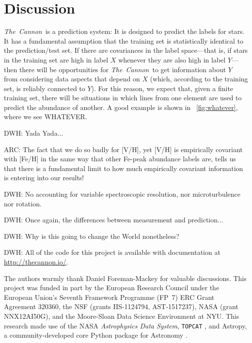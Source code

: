 \documentclass[12pt,preprint]{aastex}
\newcommand{\project}[1]{\textsl{#1}}
\newcommand{\TheCannon}{\project{The~Cannon}}
\newcommand{\acronym}[1]{{\small{#1}}}
\begin{document}
\section{Discussion}
\label{sec:discussion}




\TheCannon\ is a prediction system: It is designed to predict the labels for 
stars.  It has a fundamental assumption that the training set is statistically
identical to the prediction/test set.  If there are covariances in the label 
space---that is, if stars in the training set are high in label $X$ whenever
they are also high in label $Y$---then there will be opportunities for 
\TheCannon\ to get information about $Y$ from considering data aspects that 
depend on $X$ (which, according to the training set, is reliably connected to 
$Y$).  For this reason, we expect that, given a finite training set, there will
be situations in which lines from one element are used to predict the abundance
of another.  A good example is shown in \figurename~\ref{fig:whatever}, where we
see WHATEVER.

DWH: Yada Yada...


ARC: The fact that we do so badly for [V/H], yet [V/H] is empirically covariant with [Fe/H] in the same way that other Fe-peak abundance labels are, tells us that there is a fundamental limit to how much empirically covariant information is entering into our results!


DWH: No accounting for variable spectroscopic resolution, nor
microturbulence nor rotation.

DWH:  Once again, the differences between measurement and prediction...

DWH:  Why is this going to change the World nonetheless?

DWH: All of the code for this project is available with documentation
at \url{http://thecannon.io/}.

\acknowledgements
The authors warmly thank Daniel Foreman-Mackey for valuable discussions.
This project was funded in part by
  the European Research Council under the European Union's Seventh Framework 
  Programme (FP~7) \acronym{ERC} Grant Agreement 320360,
  the \acronym{NSF} (grants \acronym{IIS-1124794}, \acronym{AST-1517237}),
  \acronym{NASA} (grant \acronym{NNX12AI50G}), and 
  the Moore-Sloan Data Science Environment at \acronym{NYU}.
This research made use of 
  the \acronym{NASA} \project{Astrophysics Data System},
  \texttt{TOPCAT} \citep{Taylor_2005}, and 
  Astropy, a community-developed core Python package for Astronomy \citep{astropy}.
\end{document}
